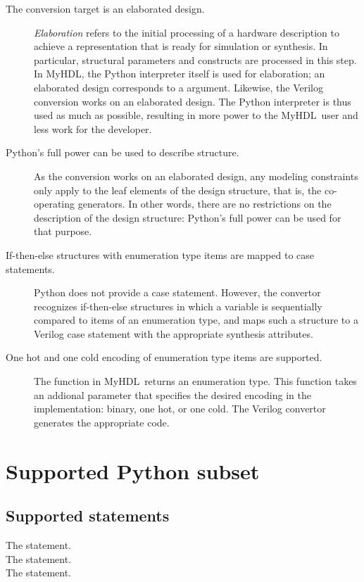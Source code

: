 \documentclass{howto}
\newcommand{\myhdl}{\protect \mbox{MyHDL}}
\begin{document}
\begin{description}
\item[The conversion target is an elaborated design.]
\emph{Elaboration} refers to the initial processing of
a hardware description to achieve a representation that
is ready for simulation or synthesis. In particular, structural
parameters and constructs are processed in this step. In
\myhdl{}, the Python interpreter itself is used for elaboration;
an elaborated design corresponds to a 
argument. Likewise, the Verilog conversion works on an
elaborated design. The Python interpreter is thus used
as much as possible, resulting in more power to the 
\myhdl\ user and less work for the developer.

\item[Python's full power can be used to describe structure.]
As the conversion works on an elaborated design, any modeling
constraints only apply to the leaf elements of the design
structure, that is, the co-operating generators. In other words, there
are no restrictions on the description of the design structure:
Python's full power can be used for that purpose.

\item[If-then-else structures with enumeration type items are mapped to case statements.]
Python does not provide a case statement. However, 
the convertor recognizes if-then-else structures in which a variable is
sequentially compared to items of an enumeration type, and maps
such a structure to a Verilog case statement with the appropriate
synthesis attributes.

\item[One hot and one cold encoding of enumeration type items are supported.]
The  function in \myhdl\ returns an enumeration type. This
function takes an addional parameter  that specifies the
desired encoding in the implementation: binary, one hot, or one cold.
The Verilog convertor generates the appropriate code.


\end{description}


\section{Supported Python subset}

\subsection{Supported statements}
\begin{description}

\item[The  statement.]

\item[The  statement.]

\item[The  statement.]

\end{description}
\end{document}
